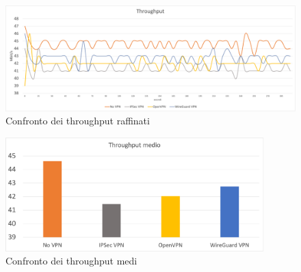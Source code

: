 \begin{figure}[ht]
    \centering
    \includegraphics[width=14cm]{figure/fineThroughput.png}
    \caption{Confronto dei throughput raffinati}
\end{figure}

\begin{figure}[ht]
    \centering
    \includegraphics[width=10cm]{figure/avg.png}
    \caption{Confronto dei throughput medi}
\end{figure}